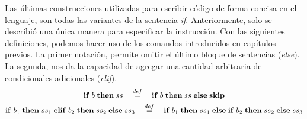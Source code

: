 Las últimas construcciones utilizadas para escribir código de forma concisa en el lenguaje, son todas las variantes de la sentencia \textit{if}.
Anteriormente, solo se describió una única manera para especificar la instrucción.
Con las siguientes definiciones, podemos hacer uso de los comandos introducidos en capítulos previos.
La primer notación, permite omitir el último bloque de sentencias (\textit{else}).
La segunda, nos da la capacidad de agregar una cantidad arbitraria de condicionales adicionales (\textit{elif}).
\begin{gather*}
\mathbf{if} \; b \; \mathbf{then} \; ss
\quad
\overset{def}{=}
\quad
\mathbf{if} \; b \; \mathbf{then} \; ss \; \mathbf{else} \; \mathbf{skip}
\\
\mathbf{if} \; b_1 \; \mathbf{then} \; ss_1 \; \mathbf{elif} \; b_2 \; \mathbf{then} \; ss_2 \; \mathbf{else} \; ss_3
\quad
\overset{def}{=}
\quad
\mathbf{if} \; b_1 \; \mathbf{then} \; ss_1 \; \mathbf{else} \; \mathbf{if} \; b_2 \; \mathbf{then} \; ss_2 \; \mathbf{else} \; ss_3
\end{gather*}